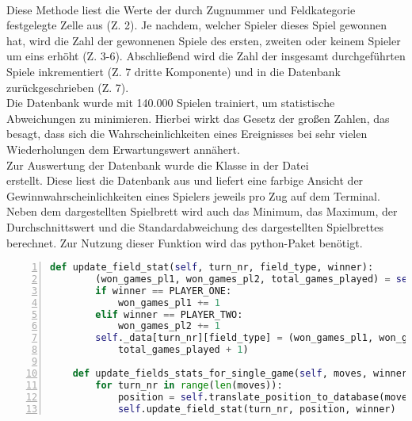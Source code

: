 \\Diese Methode liest die Werte der durch Zugnummer und Feldkategorie festgelegte Zelle aus (Z. 2). Je nachdem, welcher Spieler dieses Spiel gewonnen hat, wird die Zahl der gewonnenen Spiele des ersten, zweiten oder keinem Spieler um eins erhöht (Z. 3-6). Abschließend wird die Zahl der insgesamt durchgeführten Spiele inkrementiert (Z. 7 dritte Komponente) und in die Datenbank zurückgeschrieben (Z. 7).
\\Die Datenbank wurde mit 140.000 Spielen trainiert, um statistische Abweichungen zu minimieren. Hierbei wirkt das Gesetz der großen Zahlen, das besagt, dass sich die Wahrscheinlichkeiten eines Ereignisses bei sehr vielen Wiederholungen dem Erwartungswert annähert.
\\Zur Auswertung der Datenbank wurde die Klasse  in der Datei \\ erstellt. Diese liest die Datenbank aus und liefert eine farbige Ansicht der Gewinnwahrscheinlichkeiten eines Spielers jeweils pro Zug auf dem Terminal. Neben dem dargestellten Spielbrett wird auch das Minimum, das Maximum, der Durchschnittswert und die Standardabweichung des dargestellten Spielbrettes berechnet. Zur Nutzung dieser Funktion wird das python-Paket  benötigt.
\newpage
\begin{lstlisting}[basicstyle=\footnotesize, caption = {Befüllen der Datenbank 2}, language = python, captionpos = t , numbers=left, label={lst:train2}]
	def update_field_stat(self, turn_nr, field_type, winner):
		(won_games_pl1, won_games_pl2, total_games_played) = self._data[turn_nr][field_type]
		if winner == PLAYER_ONE:
			won_games_pl1 += 1
		elif winner == PLAYER_TWO:
			won_games_pl2 += 1
		self._data[turn_nr][field_type] = (won_games_pl1, won_games_pl2, 
			total_games_played + 1)

	def update_fields_stats_for_single_game(self, moves, winner):
		for turn_nr in range(len(moves)):
			position = self.translate_position_to_database(moves[turn_nr])
			self.update_field_stat(turn_nr, position, winner)
\end{lstlisting}

